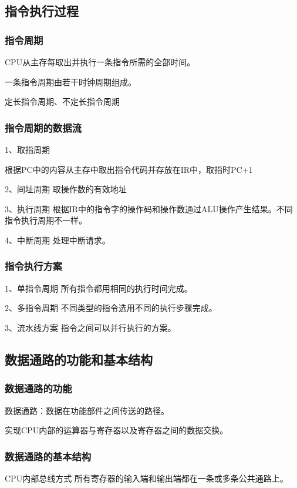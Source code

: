 \documentclass{ctexart}
\begin{document}
\subsection{指令执行过程}

\subsubsection{指令周期}

CPU从主存每取出并执行一条指令所需的全部时间。

一条指令周期由若干时钟周期组成。

定长指令周期、不定长指令周期

\subsubsection{指令周期的数据流}

1、取指周期

根据PC中的内容从主存中取出指令代码并存放在IR中，取指时PC+1

2、间址周期
取操作数的有效地址

3、执行周期
根据IR中的指令字的操作码和操作数通过ALU操作产生结果。不同指令执行周期不一样。

4、中断周期
处理中断请求。


\subsubsection{指令执行方案}

1、单指令周期
所有指令都用相同的执行时间完成。

2、多指令周期
不同类型的指令选用不同的执行步骤完成。

3、流水线方案
指令之间可以并行执行的方案。


\subsection{数据通路的功能和基本结构}

\subsubsection{数据通路的功能}
数据通路：数据在功能部件之间传送的路径。

实现CPU内部的运算器与寄存器以及寄存器之间的数据交换。

\subsubsection{数据通路的基本结构}
CPU内部总线方式
所有寄存器的输入端和输出端都在一条或多条公共通路上。
\end{document}
